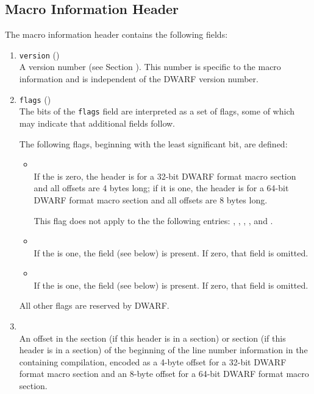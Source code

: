 \subsection{Macro Information Header}
The macro information header contains the following fields:

\begin{enumerate}[1. ]
\item \texttt{version} (\HFTuhalf) \\
A version number (see Section ).
This number is specific to the macro information and is independent
of the DWARF version number.

\item \texttt{flags} (\HFTubyte) \\
The bits of the \texttt{flags} field are interpreted as a set
of flags, some of which may indicate that additional fields follow.

The following flags, beginning with the least significant bit, are defined:
\begin{itemize}
\item \HFNoffsetsizeflag \\
If the \HFNoffsetsizeflag{} is zero, the header is for a 32-bit 
DWARF format macro section and all offsets are 4 bytes long;
if it is one, the header is for a 64-bit DWARF format macro section 
and all offsets are 8 bytes long.

\bb
This flag does not apply to the the following entries:
\DWMACROdefinesupfour,
\DWMACROdefinesupeight,
\DWMACROundefsupfour,
\DWMACROundefsupeight,
\DWMACROimportsupfour{} and
\DWMACROimportsupeight.
\eb

\item {} \\
If the  is one, 
the  field (see below) is present. 
If zero, that field is omitted.

\item {} \\
If the  is one,
the  field (see below) is present.
If zero, that field is omitted.

\end{itemize}
All other flags are reserved by DWARF.

\item {} \\
An offset in the \dotdebugline{} section 
\bb
(if this header is in a \dotdebugmacro{} section) or \dotdebuglinedwo{} 
section (if this header is in a \dotdebugmacrodwo{} section)
\eb
of the beginning of the line number information in the containing
compilation, encoded as a 4-byte offset for a 32-bit DWARF 
format macro section and an 8-byte offset for a 64-bit DWARF format
macro section.  


\end{enumerate}
